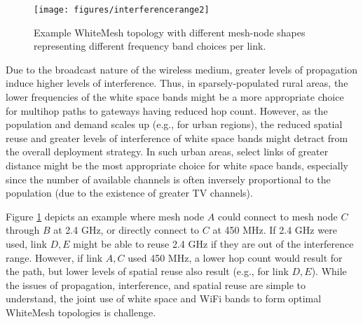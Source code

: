 \begin{figure}
\vspace{-0.0in}
\centering
\texttt{[image: figures/interferencerange2]}
\vspace{-0.1in}
\caption{Example WhiteMesh topology with different mesh-node shapes 
representing different frequency band choices per link.}
\label{fig:interferencerange}
\vspace{-0.2in}
\end{figure}

Due to the broadcast nature of the wireless medium, greater levels of
propagation induce higher levels of interference.  Thus, in sparsely-populated
rural areas, the lower frequencies of the white space bands might be a
more appropriate choice for multihop paths to gateways having reduced hop
count. However, as the population and demand scales up (e.g., for 
urban regions), the reduced spatial reuse and greater levels of interference 
of white space bands might detract from the overall deployment strategy. In 
such urban areas, select links of greater distance might be the most 
appropriate choice for white space bands, especially since the number of 
available channels is often inversely proportional to the population (due 
to the existence of greater TV channels).

Figure \ref{fig:interferencerange} depicts an example where mesh node $A$ 
could connect to mesh node $C$ through $B$ at 2.4 GHz, or directly connect 
to $C$ at 450 MHz. If 2.4 GHz were used, link $D,E$ might be able to reuse
2.4 GHz if they are out of the interference range. However, if link $A,C$
used 450 MHz, a lower hop count would result for the path, but lower levels
of spatial reuse also result (e.g., for link $D,E$). While the issues of 
propagation, interference, and spatial reuse are simple to understand,
the joint use of white space and WiFi bands to form optimal WhiteMesh 
topologies is challenge.


